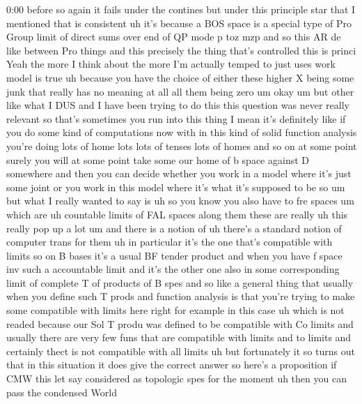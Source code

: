 \begin{unfinished}{0:00}
before  so  again  it  fails  under  the
contines  but  under  this  principle  star
that  I  mentioned  that  is
consistent  uh  it's
because  a  BOS  space  is  a  special  type  of
Pro
Group  limit  of  direct  sums  over  end  of
QP  mode  p  toz
mzp  and  so  this  AR  de  like  between  Pro
things  and  this  precisely  the  thing
that's
controlled  this  is
princi
Yeah  the  more  I  think  about  the  more  I'm
actually  temped  to  just
uses  work  model  is  true  uh  because  you
have  the  choice  of  either  these  higher  X
being  some  junk  that  really  has  no
meaning  at  all  all  them  being
zero
um  okay
um  but  other  like  what  I  DUS  and  I  have
been  trying  to  do  this  this  question  was
never  really  relevant  so  that's
sometimes  you  run  into  this  thing  I  mean
it's  definitely  like  if  you  do  some  kind
of  computations  now  with  in  this  kind  of
solid  function  analysis  you're  doing
lots  of  home  lots  lots  of  tenses  lots  of
homes  and  so  on  at  some  point  surely  you
will  at  some  point  take  some  our  home  of
b  space  against  D  somewhere  and  then  you
can  decide  whether  you  work  in  a  model
where  it's  just  some  joint  or  you  work
in  this  model  where  it's  what  it's
supposed  to  be
so  um  but  what  I  really  wanted  to  say  is
uh  so  you  know  you  also  have  to  fre
spaces  um  which  are  uh  countable  limits
of  FAL  spaces  along
them
these  are  really  uh  this  really  pop  up  a
lot
um  and  there  is  a  notion  of  uh  there's  a
standard  notion  of  computer  trans  for
them  uh  in  particular  it's  the  one
that's  compatible  with
limits
so  on  B  bases  it's  a  usual  BF  tender
product  and  when  you  have  f  space  inv
such  a  accountable  limit  and  it's  the
other  one  also  in  some  corresponding
limit  of  complete  T  of  products  of  B
spes  and  so  like  a  general  thing  that
usually  when  you  define  such  T  prods  and
function  analysis  is  that  you're  trying
to  make  some  compatible  with  limits  here
right  for  example  in  this  case
uh  which  is  not  readed  because  our  Sol  T
produ  was  defined  to  be  compatible  with
Co
limits  and  usually  there  are  very  few
funs  that  are  compatible  with  limits  and
to  limits  and  certainly  thect  is  not
compatible  with  all  limits  uh  but
fortunately  it  so  turns  out  that  in  this
situation  it  does  give  the  correct
answer  so  here's  a
proposition  if
CMW  this
let  say  considered  as  topologic  spes  for
the
moment
uh  then  you  can  pass  the  condensed  World

\end{unfinished}
